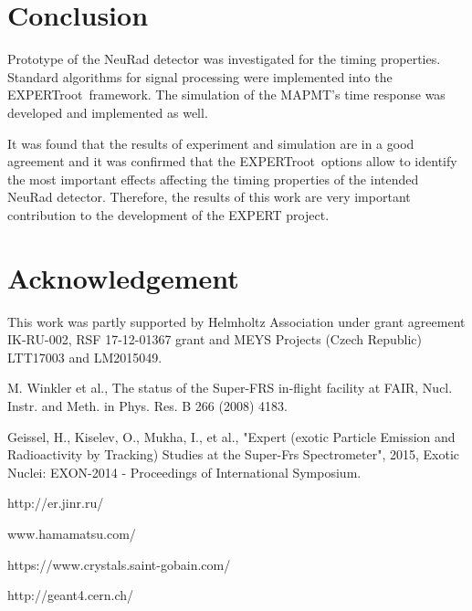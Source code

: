 \documentclass{webofc}
\newcommand{\er}{\textmd{EXPERTroot}}
\begin{document}
	


\section{Conclusion}
	
	Prototype of the NeuRad detector was investigated for the timing properties.
	Standard algorithms for signal processing were implemented into the \er\ framework. The simulation of the MAPMT's time response was developed and implemented as well.
	
	
	It was found that the results of experiment and simulation are in a good agreement and it was confirmed that the \er\ options allow to identify the most important effects affecting the timing properties of the intended NeuRad detector.
	Therefore, the results of this work are very important contribution to the development of the EXPERT project.
	
\section{Acknowledgement}
This  work was partly supported by Helmholtz Association under grant agreement IK-RU-002, RSF 17-12-01367 grant and MEYS Projects (Czech Republic) LTT17003 and LM2015049.

	
\begin{thebibliography}{99}
	
	M. Winkler et al., The status of the Super-FRS in-flight facility at FAIR, Nucl. Instr. and Meth. in Phys. Res. B 266 (2008) 4183.
	
	Geissel, H., Kiselev, O., Mukha, I., et al., "Expert (exotic Particle Emission and Radioactivity by Tracking) Studies at the Super-Frs Spectrometer", 2015, Exotic Nuclei: EXON-2014 - Proceedings of International Symposium.
	
	http://er.jinr.ru/
	
	www.hamamatsu.com/
	
	https://www.crystals.saint-gobain.com/
	
	http://geant4.cern.ch/
	
\end{thebibliography}
\end{document}
